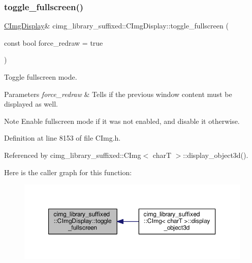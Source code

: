 \subsubsection{\texorpdfstring{toggle\+\_\+fullscreen()}{toggle\_fullscreen()}}
{\footnotesize\ttfamily \hyperlink{structcimg__library__suffixed_1_1CImgDisplay}{C\+Img\+Display}\& cimg\+\_\+library\+\_\+suffixed\+::\+C\+Img\+Display\+::toggle\+\_\+fullscreen (\begin{DoxyParamCaption}\item[{const bool}]{force\+\_\+redraw = {\ttfamily true} }\end{DoxyParamCaption})\hspace{0.3cm}{\ttfamily [inline]}}



Toggle fullscreen mode. 


\begin{DoxyParams}{Parameters}
{\em force\+\_\+redraw} & Tells if the previous window content must be displayed as well. \\
\hline
\end{DoxyParams}
\begin{DoxyNote}{Note}
Enable fullscreen mode if it was not enabled, and disable it otherwise. 
\end{DoxyNote}


Definition at line 8153 of file C\+Img.\+h.



Referenced by cimg\+\_\+library\+\_\+suffixed\+::\+C\+Img$<$ char\+T $>$\+::display\+\_\+object3d().

Here is the caller graph for this function\+:
\nopagebreak
\begin{figure}[H]
\begin{center}
\leavevmode
\includegraphics[width=350pt]{d5/d53/structcimg__library__suffixed_1_1CImgDisplay_a1f98bd17638afff76af6bb94af98b73a_icgraph}
\end{center}
\end{figure}
\mbox{\label{structcimg__library__suffixed_1_1CImgDisplay_a6a6bf6d5a43424d8e9728563dc79aa3f}} 
